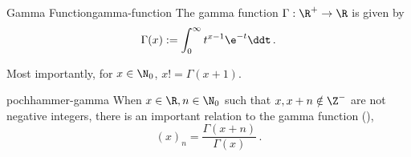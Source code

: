 \begin{definition}{Gamma Function}{gamma-function}
  The gamma function $\Gamma: \R^+ \to \R$ is given by
  $$\Gamma(x) := \int_0^\infty t^{x-1}\e^{-t} \ddt\,.$$
\end{definition}

Most importantly, for $x \in \N_0$, $x! = \Gamma(x+1)$.

\begin{remark}{}{pochhammer-gamma}
  When $x \in \R, n \in \N_0$ such that $x, x+n \notin \Z^-$ are not negative integers, there is an important relation to the gamma function (),
  $$(x)_n = \frac{\Gamma(x+n)}{\Gamma(x)}\,.$$
\end{remark}
